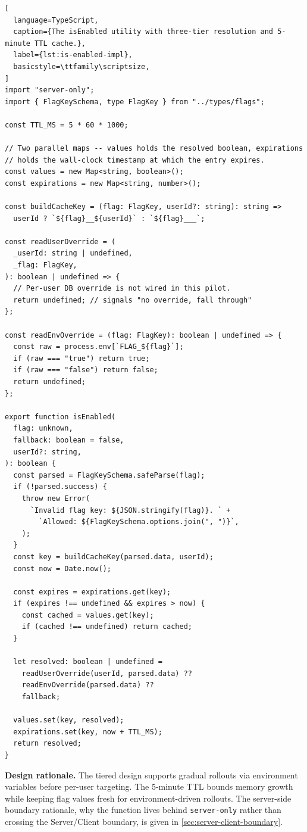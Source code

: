 \documentclass[12pt,a4paper]{report}
\newcommand{\pkg}[1]{\texttt{\nolinkurl{#1}}}
\begin{document}
\begin{lstlisting}[
  language=TypeScript,
  caption={The isEnabled utility with three-tier resolution and 5-minute TTL cache.},
  label={lst:is-enabled-impl},
  basicstyle=\ttfamily\scriptsize,
]
import "server-only";
import { FlagKeySchema, type FlagKey } from "../types/flags";

const TTL_MS = 5 * 60 * 1000;

// Two parallel maps -- values holds the resolved boolean, expirations
// holds the wall-clock timestamp at which the entry expires.
const values = new Map<string, boolean>();
const expirations = new Map<string, number>();

const buildCacheKey = (flag: FlagKey, userId?: string): string =>
  userId ? `${flag}__${userId}` : `${flag}___`;

const readUserOverride = (
  _userId: string | undefined,
  _flag: FlagKey,
): boolean | undefined => {
  // Per-user DB override is not wired in this pilot.
  return undefined; // signals "no override, fall through"
};

const readEnvOverride = (flag: FlagKey): boolean | undefined => {
  const raw = process.env[`FLAG_${flag}`];
  if (raw === "true") return true;
  if (raw === "false") return false;
  return undefined;
};

export function isEnabled(
  flag: unknown,
  fallback: boolean = false,
  userId?: string,
): boolean {
  const parsed = FlagKeySchema.safeParse(flag);
  if (!parsed.success) {
    throw new Error(
      `Invalid flag key: ${JSON.stringify(flag)}. ` +
        `Allowed: ${FlagKeySchema.options.join(", ")}`,
    );
  }
  const key = buildCacheKey(parsed.data, userId);
  const now = Date.now();

  const expires = expirations.get(key);
  if (expires !== undefined && expires > now) {
    const cached = values.get(key);
    if (cached !== undefined) return cached;
  }

  let resolved: boolean | undefined =
    readUserOverride(userId, parsed.data) ??
    readEnvOverride(parsed.data) ??
    fallback;

  values.set(key, resolved);
  expirations.set(key, now + TTL_MS);
  return resolved;
}
\end{lstlisting}

\bigskip\noindent\textbf{Design rationale.}
The tiered design supports gradual rollouts via environment variables before per-user targeting. The 5-minute TTL bounds memory growth while keeping flag values fresh for environment-driven rollouts. The server-side boundary rationale, why the function lives behind \pkg{server-only} rather than crossing the Server/Client boundary, is given in \autoref{sec:server-client-boundary}.
\end{document}
